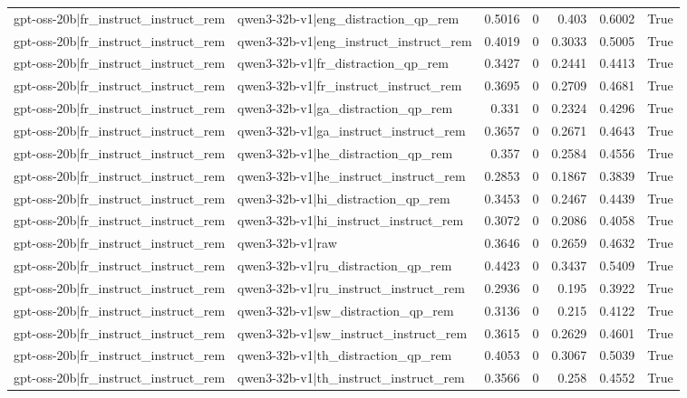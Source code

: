\begin{table}
\begin{tabular}{l l r r r r l}
gpt-oss-20b|fr_instruct_instruct_rem & qwen3-32b-v1|eng_distraction_qp_rem & 0.5016 & 0 & 0.403 & 0.6002 & True \\
gpt-oss-20b|fr_instruct_instruct_rem & qwen3-32b-v1|eng_instruct_instruct_rem & 0.4019 & 0 & 0.3033 & 0.5005 & True \\
gpt-oss-20b|fr_instruct_instruct_rem & qwen3-32b-v1|fr_distraction_qp_rem & 0.3427 & 0 & 0.2441 & 0.4413 & True \\
gpt-oss-20b|fr_instruct_instruct_rem & qwen3-32b-v1|fr_instruct_instruct_rem & 0.3695 & 0 & 0.2709 & 0.4681 & True \\
gpt-oss-20b|fr_instruct_instruct_rem & qwen3-32b-v1|ga_distraction_qp_rem & 0.331 & 0 & 0.2324 & 0.4296 & True \\
gpt-oss-20b|fr_instruct_instruct_rem & qwen3-32b-v1|ga_instruct_instruct_rem & 0.3657 & 0 & 0.2671 & 0.4643 & True \\
gpt-oss-20b|fr_instruct_instruct_rem & qwen3-32b-v1|he_distraction_qp_rem & 0.357 & 0 & 0.2584 & 0.4556 & True \\
gpt-oss-20b|fr_instruct_instruct_rem & qwen3-32b-v1|he_instruct_instruct_rem & 0.2853 & 0 & 0.1867 & 0.3839 & True \\
gpt-oss-20b|fr_instruct_instruct_rem & qwen3-32b-v1|hi_distraction_qp_rem & 0.3453 & 0 & 0.2467 & 0.4439 & True \\
gpt-oss-20b|fr_instruct_instruct_rem & qwen3-32b-v1|hi_instruct_instruct_rem & 0.3072 & 0 & 0.2086 & 0.4058 & True \\
gpt-oss-20b|fr_instruct_instruct_rem & qwen3-32b-v1|raw & 0.3646 & 0 & 0.2659 & 0.4632 & True \\
gpt-oss-20b|fr_instruct_instruct_rem & qwen3-32b-v1|ru_distraction_qp_rem & 0.4423 & 0 & 0.3437 & 0.5409 & True \\
gpt-oss-20b|fr_instruct_instruct_rem & qwen3-32b-v1|ru_instruct_instruct_rem & 0.2936 & 0 & 0.195 & 0.3922 & True \\
gpt-oss-20b|fr_instruct_instruct_rem & qwen3-32b-v1|sw_distraction_qp_rem & 0.3136 & 0 & 0.215 & 0.4122 & True \\
gpt-oss-20b|fr_instruct_instruct_rem & qwen3-32b-v1|sw_instruct_instruct_rem & 0.3615 & 0 & 0.2629 & 0.4601 & True \\
gpt-oss-20b|fr_instruct_instruct_rem & qwen3-32b-v1|th_distraction_qp_rem & 0.4053 & 0 & 0.3067 & 0.5039 & True \\
gpt-oss-20b|fr_instruct_instruct_rem & qwen3-32b-v1|th_instruct_instruct_rem & 0.3566 & 0 & 0.258 & 0.4552 & True \\

\end{tabular}
\end{table}
